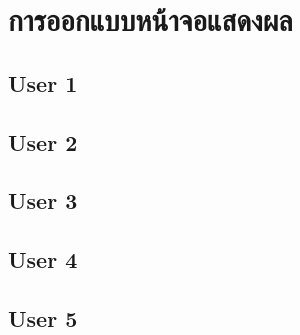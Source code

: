 \baselineskip=8mm
\renewcommand{\thesubsection}{\arabic{subsection}.}
\renewcommand{\theequation}{\thesection.\arabic{equation}}
\renewcommand{\thesection}{}
\renewcommand{\thesubsubsection}{\thesubsection\arabic{subsubsection}.}




\section{การออกแบบหน้าจอแสดงผล}



\subsection{User 1}

\subsection{User 2}

\subsection{User 3}

\subsection{User 4}

\subsection{User 5}

